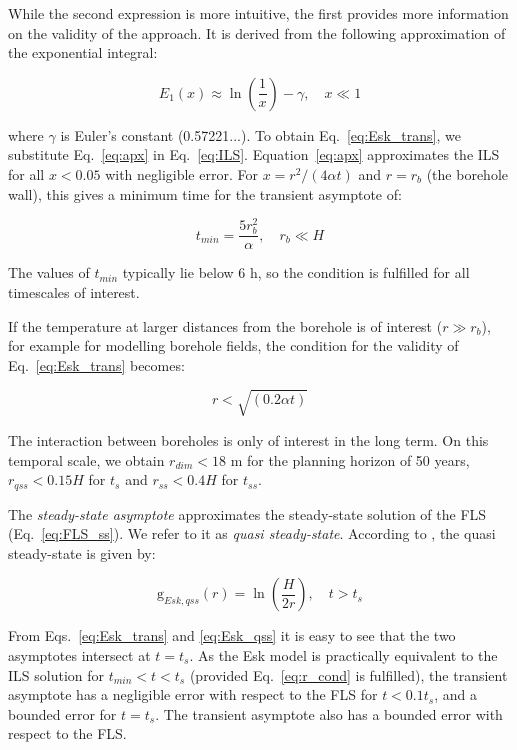 While the second expression is more intuitive, the first provides more information on the validity of the approach. It is derived from the following approximation of the exponential integral:

\begin{equation}
\label{eq:apx}
    E_1\left(x\right) \approx \ln\left(\frac{1}{x}\right) - \gamma, \quad x \ll 1
\end{equation}

where $\gamma$ is Euler's constant (0.57221...). To obtain Eq.~\ref{eq:Esk_trans}, we substitute Eq.~\ref{eq:apx} in Eq.~\ref{eq:ILS}.
Equation~\ref{eq:apx} approximates the ILS for all $x < 0.05$ with negligible error. For $x = r^2/(4 \alpha t)$ and $r = r_b$ (the borehole wall), this gives a minimum time for the transient asymptote of:

\begin{equation}
    t_{min} = \frac{5 r_b^2}{\alpha}, \quad r_b \ll H
\end{equation}

The values of $t_{min}$ typically lie below 6 h, so the condition is fulfilled for all timescales of interest.

If the temperature at larger distances from the borehole is of interest ($r \gg r_b$), for example for modelling borehole fields, the condition for the validity of Eq.~\ref{eq:Esk_trans} becomes:

\begin{equation}
\label{eq:r_cond}
    r < \sqrt{(0.2 \alpha t )}
\end{equation}

The interaction between boreholes is only of interest in the long term. On this temporal scale, we obtain $r_{dim} < 18$ m for the planning horizon of 50 years, $r_{qss} < 0.15H$ for $t_s$ and $r_{ss} < 0.4H$ for $t_{ss}$.

The \textit{steady-state asymptote} approximates the steady-state solution of the FLS (Eq.~\ref{eq:FLS_ss}). We refer to it as \textit{quasi steady-state}. According to \citet{eskilson_thermal_1987}, the quasi steady-state is given by:

\begin{equation}
\label{eq:Esk_qss}
    \mathrm{g}_{Esk, qss}(r) = \ln\left(\frac{H}{2 r}\right), \quad t > t_s
\end{equation}

From Eqs.~\ref{eq:Esk_trans} and \ref{eq:Esk_qss} it is easy to see that the two asymptotes intersect at $t = t_s$.
As the Esk model is practically equivalent to the ILS solution for $t_{min} < t < t_s$ (provided Eq.~\ref{eq:r_cond} is fulfilled), the transient asymptote has a negligible error with respect to the FLS for $t < 0.1 t_s$, and a bounded error for $t = t_s$. The transient asymptote also has a bounded error with respect to the FLS.

